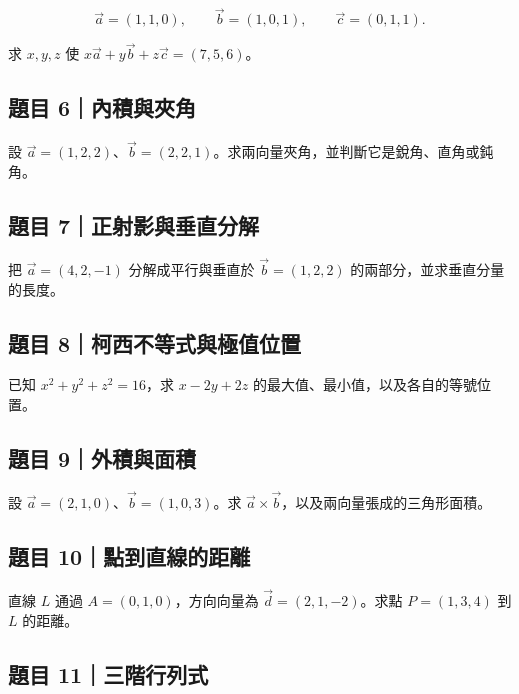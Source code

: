 \documentclass[11pt,a4paper]{article}
\begin{document}
\[
\vec a=(1,1,0),\qquad
\vec b=(1,0,1),\qquad
\vec c=(0,1,1).
\]

求 \(x,y,z\) 使 \(x\vec a+y\vec b+z\vec c=(7,5,6)\)。

\subsection{題目 6｜內積與夾角}\label{ux984cux76ee-6ux5167ux7a4dux8207ux593eux89d2}

設 \(\vec a=(1,2,2)\)、\(\vec b=(2,2,1)\)。求兩向量夾角，並判斷它是銳角、直角或鈍角。

\subsection{題目 7｜正射影與垂直分解}\label{ux984cux76ee-7ux6b63ux5c04ux5f71ux8207ux5782ux76f4ux5206ux89e3}

把 \(\vec a=(4,2,-1)\) 分解成平行與垂直於 \(\vec b=(1,2,2)\) 的兩部分，並求垂直分量的長度。

\subsection{題目 8｜柯西不等式與極值位置}\label{ux984cux76ee-8ux67efux897fux4e0dux7b49ux5f0fux8207ux6975ux503cux4f4dux7f6e}

已知 \(x^2+y^2+z^2=16\)，求 \(x-2y+2z\) 的最大值、最小值，以及各自的等號位置。

\subsection{題目 9｜外積與面積}\label{ux984cux76ee-9ux5916ux7a4dux8207ux9762ux7a4d}

設 \(\vec a=(2,1,0)\)、\(\vec b=(1,0,3)\)。求 \(\vec a\times\vec b\)，以及兩向量張成的三角形面積。

\subsection{題目 10｜點到直線的距離}\label{ux984cux76ee-10ux9edeux5230ux76f4ux7ddaux7684ux8dddux96e2}

直線 \(L\) 通過 \(A=(0,1,0)\)，方向向量為 \(\vec d=(2,1,-2)\)。求點 \(P=(1,3,4)\) 到 \(L\) 的距離。

\subsection{題目 11｜三階行列式}\label{ux984cux76ee-11ux4e09ux968eux884cux5217ux5f0f}
\end{document}
